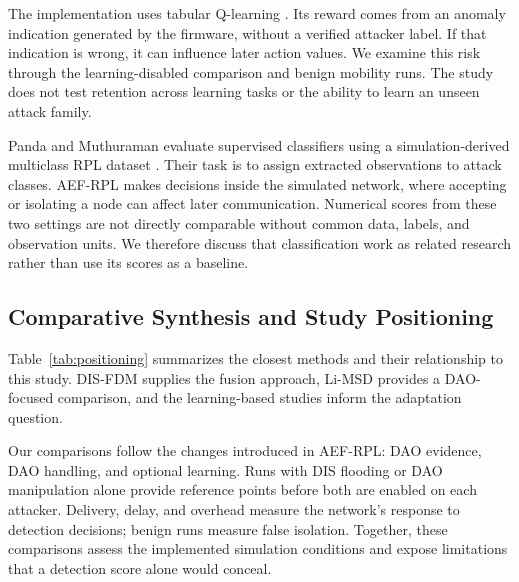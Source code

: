 \documentclass[journal]{IEEEtran}
\begin{document}
The implementation uses tabular Q-learning \cite{watkins1992}. Its reward comes from an anomaly indication generated by the firmware, without a verified attacker label. If that indication is wrong, it can influence later action values. We examine this risk through the learning-disabled comparison and benign mobility runs. The study does not test retention across learning tasks or the ability to learn an unseen attack family.

Panda and Muthuraman evaluate supervised classifiers using a simulation-derived multiclass RPL dataset \cite{panda2026}. Their task is to assign extracted observations to attack classes. AEF-RPL makes decisions inside the simulated network, where accepting or isolating a node can affect later communication. Numerical scores from these two settings are not directly comparable without common data, labels, and observation units. We therefore discuss that classification work as related research rather than use its scores as a baseline.

\subsection{Comparative Synthesis and Study Positioning}
Table~\ref{tab:positioning} summarizes the closest methods and their relationship to this study. DIS-FDM supplies the fusion approach, Li-MSD provides a DAO-focused comparison, and the learning-based studies inform the adaptation question.

Our comparisons follow the changes introduced in AEF-RPL: DAO evidence, DAO handling, and optional learning. Runs with DIS flooding or DAO manipulation alone provide reference points before both are enabled on each attacker. Delivery, delay, and overhead measure the network's response to detection decisions; benign runs measure false isolation. Together, these comparisons assess the implemented simulation conditions and expose limitations that a detection score alone would conceal.
\end{document}
